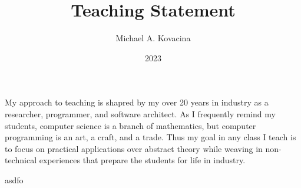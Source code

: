 \documentclass[12pt]{article}
\title{Teaching Statement}
\author{Michael A. Kovacina}
\date{2023}
\begin{document}
  \maketitle

My approach to teaching is shapred by my over 20 years in industry as a researcher, programmer, and software architect.  As I frequently remind my students, computer science is a branch of mathematics, but computer programming is an art, a craft, and a trade.  Thus my goal in any class I teach is to focus on practical applications over abstract theory while weaving in non-technical experiences that prepare the students for life in industry.

asdfo
\end{document}
